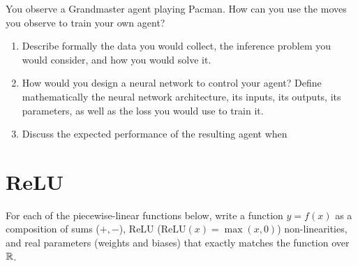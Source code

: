 \documentclass[11pt, a4paper]{article}
\begin{document}
You observe a Grandmaster agent playing Pacman. How can you use the moves you observe to train your own agent?

\begin{enumerate}
    \item Describe formally the data you would collect, the inference problem you would consider, and how you would solve it.

    \item How would you design a neural network to control your agent? Define mathematically the neural network architecture, its inputs, its outputs, its parameters, as well as the loss you would use to train it.

    \item Discuss the expected performance of the resulting agent when 
\end{enumerate}

\newpage

\section{ReLU}

For each of the piecewise-linear functions below, write a function $y = f(x)$ as a composition of sums ($+, -$), ReLU ($\mathrm{ReLU}(x) = \max(x, 0)$) non-linearities, and real parameters (weights and biases) that exactly matches the function over $\mathbb{R}$.

\begin{center}
\end{center}
\end{document}
